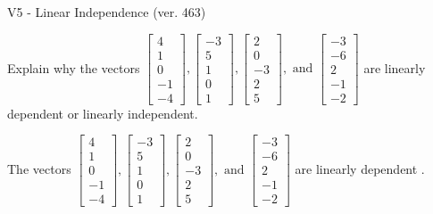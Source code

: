\begin{exercise}
  \begin{exerciseTitle}V5 - Linear Independence (ver. 463)\end{exerciseTitle}
  \begin{exerciseStatement}
    Explain why the vectors \(\left[\begin{array}{r}
4 \\
1 \\
0 \\
-1 \\
-4
\end{array}\right] , \left[\begin{array}{r}
-3 \\
5 \\
1 \\
0 \\
1
\end{array}\right] , \left[\begin{array}{r}
2 \\
0 \\
-3 \\
2 \\
5
\end{array}\right] , \text{ and } \left[\begin{array}{r}
-3 \\
-6 \\
2 \\
-1 \\
-2
\end{array}\right]\) are linearly dependent or linearly independent.	


  \end{exerciseStatement}
  \begin{exerciseAnswer}
   The vectors \(\left[\begin{array}{r}
4 \\
1 \\
0 \\
-1 \\
-4
\end{array}\right] , \left[\begin{array}{r}
-3 \\
5 \\
1 \\
0 \\
1
\end{array}\right] , \left[\begin{array}{r}
2 \\
0 \\
-3 \\
2 \\
5
\end{array}\right] , \text{ and } \left[\begin{array}{r}
-3 \\
-6 \\
2 \\
-1 \\
-2
\end{array}\right]\) are 
  	 linearly dependent  .
  


  \end{exerciseAnswer}
\end{exercise}